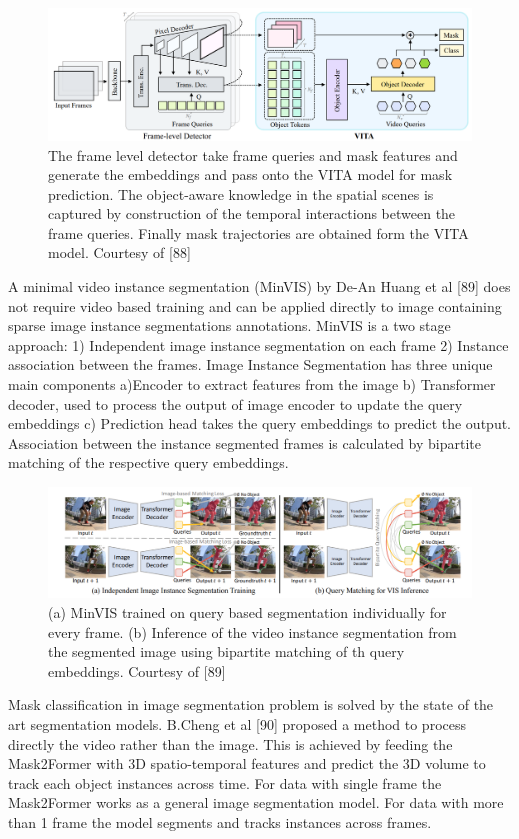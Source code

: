 	\begin{figure}
		\centering
		\includegraphics[width=13cm]{images/VITA.png}
		\caption{The frame level detector take frame queries and mask features and generate the embeddings and pass onto the VITA model for mask prediction. The object-aware knowledge in the spatial scenes is captured by construction of the temporal interactions between the frame queries. Finally mask trajectories are obtained form the VITA model. Courtesy of [88]}
		\label{fig:vita}
	\end{figure}
	A minimal video instance segmentation (MinVIS) by De-An Huang et al [89] does not require video based training and can be applied directly to image containing sparse image instance segmentations annotations. MinVIS is a two stage approach: 1) Independent image instance segmentation on each frame 2) Instance association between the frames. Image Instance Segmentation has three unique main components a)Encoder to extract features from the image b) Transformer decoder, used to process the output of image encoder to update the query embeddings c) Prediction head takes the query embeddings to predict the output. Association between the instance segmented frames is calculated by bipartite matching of the respective query embeddings.   
	
	\begin{figure}
		\centering
		\includegraphics[width=13cm]{images/minVIS.png}
		\caption{(a) MinVIS trained on query based segmentation individually for every frame. (b) Inference of the video instance segmentation from the segmented image using bipartite matching of th query embeddings. Courtesy of [89] }
		\label{fig:minVIS}
	\end{figure}
	Mask classification in image segmentation problem is solved by the state of the art segmentation models. B.Cheng et al [90] proposed a method to process directly the video rather than the image. This is achieved by feeding the Mask2Former with 3D spatio-temporal features and predict the 3D volume to track each object instances across time. For data with single frame the Mask2Former works as a general image segmentation model. For data with more than 1 frame the model segments and tracks instances across frames. 

